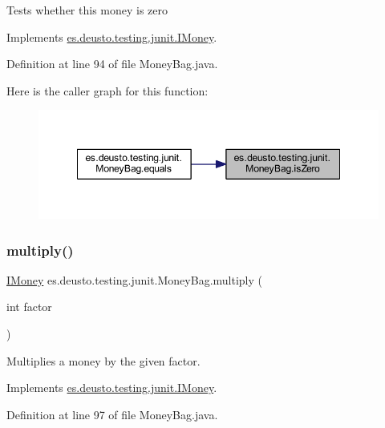 Tests whether this money is zero 

Implements \mbox{\hyperlink{interfacees_1_1deusto_1_1testing_1_1junit_1_1_i_money_a166c39b6f931e49769580a04f8c73500}{es.\+deusto.\+testing.\+junit.\+I\+Money}}.



Definition at line 94 of file Money\+Bag.\+java.

Here is the caller graph for this function\+:
\nopagebreak
\begin{figure}[H]
\begin{center}
\leavevmode
\includegraphics[width=348pt]{classes_1_1deusto_1_1testing_1_1junit_1_1_money_bag_abebc5bc39c3343cb3c4e5fb291fd5893_icgraph}
\end{center}
\end{figure}
\mbox{\label{classes_1_1deusto_1_1testing_1_1junit_1_1_money_bag_aa20ce4cc70c2ba0bc9a5ccb96635d506}} 
\subsubsection{\texorpdfstring{multiply()}{multiply()}}
{\footnotesize\ttfamily \mbox{\hyperlink{interfacees_1_1deusto_1_1testing_1_1junit_1_1_i_money}{I\+Money}} es.\+deusto.\+testing.\+junit.\+Money\+Bag.\+multiply (\begin{DoxyParamCaption}\item[{int}]{factor }\end{DoxyParamCaption})}

Multiplies a money by the given factor. 

Implements \mbox{\hyperlink{interfacees_1_1deusto_1_1testing_1_1junit_1_1_i_money_a09154f9713133d4734f72d6a20081209}{es.\+deusto.\+testing.\+junit.\+I\+Money}}.



Definition at line 97 of file Money\+Bag.\+java.

